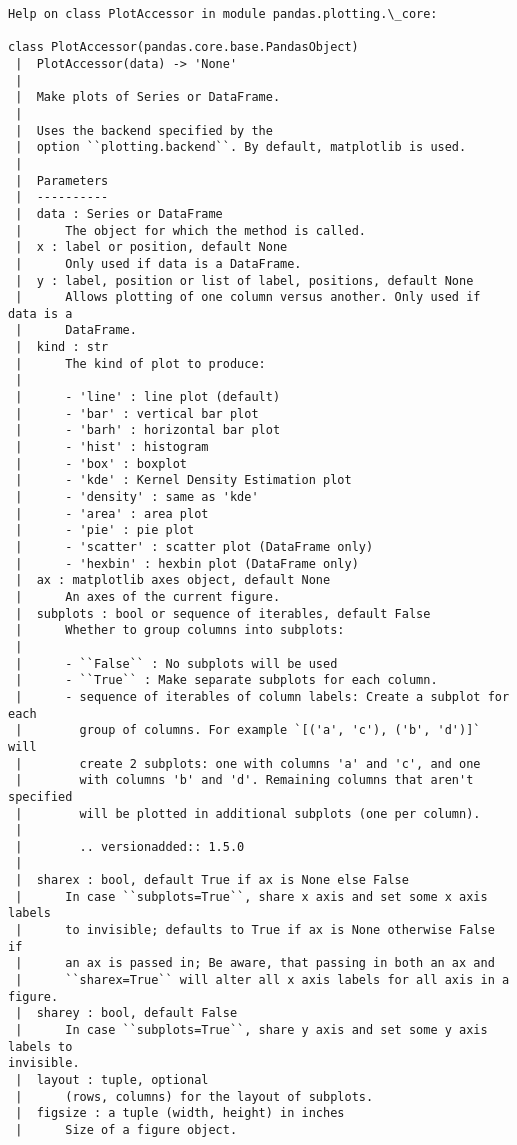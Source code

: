 \documentclass[11pt]{article}
\begin{document}
    \begin{Verbatim}[commandchars=\\\{\}]
Help on class PlotAccessor in module pandas.plotting.\_core:

class PlotAccessor(pandas.core.base.PandasObject)
 |  PlotAccessor(data) -> 'None'
 |
 |  Make plots of Series or DataFrame.
 |
 |  Uses the backend specified by the
 |  option ``plotting.backend``. By default, matplotlib is used.
 |
 |  Parameters
 |  ----------
 |  data : Series or DataFrame
 |      The object for which the method is called.
 |  x : label or position, default None
 |      Only used if data is a DataFrame.
 |  y : label, position or list of label, positions, default None
 |      Allows plotting of one column versus another. Only used if data is a
 |      DataFrame.
 |  kind : str
 |      The kind of plot to produce:
 |
 |      - 'line' : line plot (default)
 |      - 'bar' : vertical bar plot
 |      - 'barh' : horizontal bar plot
 |      - 'hist' : histogram
 |      - 'box' : boxplot
 |      - 'kde' : Kernel Density Estimation plot
 |      - 'density' : same as 'kde'
 |      - 'area' : area plot
 |      - 'pie' : pie plot
 |      - 'scatter' : scatter plot (DataFrame only)
 |      - 'hexbin' : hexbin plot (DataFrame only)
 |  ax : matplotlib axes object, default None
 |      An axes of the current figure.
 |  subplots : bool or sequence of iterables, default False
 |      Whether to group columns into subplots:
 |
 |      - ``False`` : No subplots will be used
 |      - ``True`` : Make separate subplots for each column.
 |      - sequence of iterables of column labels: Create a subplot for each
 |        group of columns. For example `[('a', 'c'), ('b', 'd')]` will
 |        create 2 subplots: one with columns 'a' and 'c', and one
 |        with columns 'b' and 'd'. Remaining columns that aren't specified
 |        will be plotted in additional subplots (one per column).
 |
 |        .. versionadded:: 1.5.0
 |
 |  sharex : bool, default True if ax is None else False
 |      In case ``subplots=True``, share x axis and set some x axis labels
 |      to invisible; defaults to True if ax is None otherwise False if
 |      an ax is passed in; Be aware, that passing in both an ax and
 |      ``sharex=True`` will alter all x axis labels for all axis in a figure.
 |  sharey : bool, default False
 |      In case ``subplots=True``, share y axis and set some y axis labels to
invisible.
 |  layout : tuple, optional
 |      (rows, columns) for the layout of subplots.
 |  figsize : a tuple (width, height) in inches
 |      Size of a figure object.

\end{Verbatim}
\end{document}
